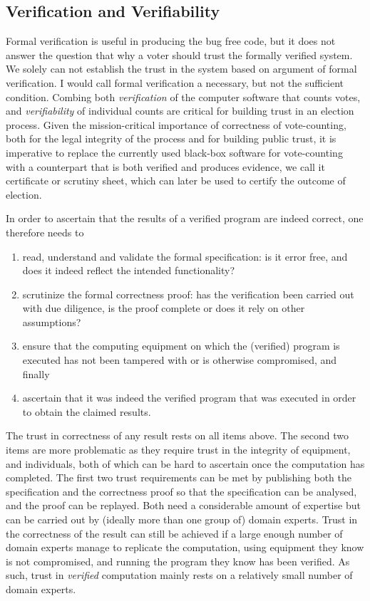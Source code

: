  \subsection{Verification and Verifiability}
   Formal verification is useful in producing the 
   bug free code, but it does not answer the question that 
   why a voter should trust the formally verified system. We solely can not 
   establish the trust in the system based on argument of 
   formal verification.  I would call formal verification a necessary, but not the sufficient condition. 
   Combing both \emph{verification} of the
	computer software that counts votes, and
	\emph{verifiability} of individual counts are critical for
	building trust in an election process.  Given the mission-critical importance of
	 correctness of vote-counting,
	both for the legal integrity of the process and for
	building public trust,  it is imperative to replace the
	currently used black-box software for vote-counting with a
	counterpart that is both verified and produces 
	evidence, we call it certificate or scrutiny sheet, which can later be used to certify
	the outcome of election.
	
	In order to ascertain that the results of a verified program are
indeed correct, one therefore needs to
\begin{enumerate}
\item read, understand and validate the formal specification: is it
error free, and does it indeed reflect the intended functionality?
\item scrutinize the formal correctness proof: has the verification
been carried out with due diligence, is the proof complete or does
it rely on other assumptions?
\item ensure that the computing equipment on which the (verified)
program is executed has not been tampered with or is otherwise
compromised, and finally
\item ascertain that it was indeed the verified program that was
executed in order to obtain the claimed results.
\end{enumerate}

\noindent
The trust in correctness of any result rests on all items above.
The second two items are
more problematic as they require trust in the integrity of
equipment, and individuals, both of which can be hard to ascertain
once the computation has completed. The
first two trust requirements can be met by publishing both the
specification and the correctness proof so that the specification
can be analysed, and the proof can be replayed. Both need a
considerable amount of expertise but can be carried out by (ideally
more than one group of) domain experts. Trust in the correctness of the
result can still be achieved if a large enough number of domain
experts manage to replicate the computation, using equipment they
know is not compromised, and running the program they know has been
verified. As such, trust in \emph{verified} computation mainly rests
on a relatively small number of domain experts.


